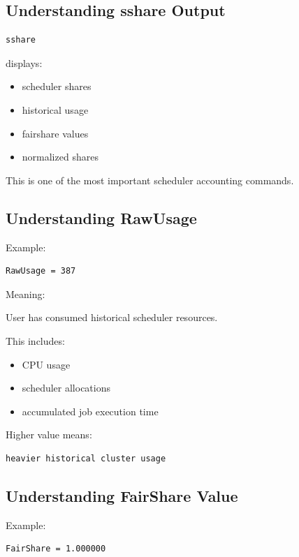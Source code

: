 \documentclass[11pt]{article}
\begin{document}
\subsection{Understanding sshare Output}
\label{sec:org7f80096}

\begin{verbatim}
sshare
\end{verbatim}

displays:

\begin{itemize}
\item scheduler shares
\item historical usage
\item fairshare values
\item normalized shares
\end{itemize}

This is one of the most important scheduler accounting commands.
\subsection{Understanding RawUsage}
\label{sec:org7983ea0}

Example:

\begin{verbatim}
RawUsage = 387
\end{verbatim}

Meaning:

User has consumed historical scheduler resources.

This includes:

\begin{itemize}
\item CPU usage
\item scheduler allocations
\item accumulated job execution time
\end{itemize}

Higher value means:

\begin{verbatim}
heavier historical cluster usage
\end{verbatim}
\subsection{Understanding FairShare Value}
\label{sec:orgab2847a}

Example:

\begin{verbatim}
FairShare = 1.000000
\end{verbatim}
\end{document}
